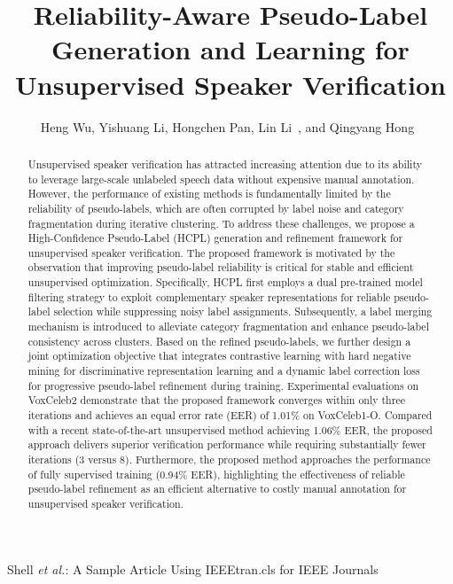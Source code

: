\documentclass[lettersize,journal]{IEEEtran}
\begin{document}
\title{Reliability-Aware Pseudo-Label Generation and Learning for Unsupervised Speaker Verification}

\author{Heng Wu, Yishuang Li, Hongchen Pan, Lin Li~, and Qingyang Hong~
}

%
{Shell \MakeLowercase{\textit{et al.}}: A Sample Article Using IEEEtran.cls for IEEE Journals}


\maketitle

\begin{abstract}
Unsupervised speaker verification has attracted increasing attention due to its ability to leverage large-scale unlabeled speech data without expensive manual annotation. However, the performance of existing methods is fundamentally limited by the reliability of pseudo-labels, which are often corrupted by label noise and category fragmentation during iterative clustering. To address these challenges, we propose a High-Confidence Pseudo-Label (HCPL) generation and refinement framework for unsupervised speaker verification. The proposed framework is motivated by the observation that improving pseudo-label reliability is critical for stable and efficient unsupervised optimization. Specifically, HCPL first employs a dual pre-trained model filtering strategy to exploit complementary speaker representations for reliable pseudo-label selection while suppressing noisy label assignments. Subsequently, a label merging mechanism is introduced to alleviate category fragmentation and enhance pseudo-label consistency across clusters. Based on the refined pseudo-labels, we further design a joint optimization objective that integrates contrastive learning with hard negative mining for discriminative representation learning and a dynamic label correction loss for progressive pseudo-label refinement during training. Experimental evaluations on VoxCeleb2 demonstrate that the proposed framework converges within only three iterations and achieves an equal error rate (EER) of 1.01\% on VoxCeleb1-O. Compared with a recent state-of-the-art unsupervised method achieving 1.06\% EER, the proposed approach delivers superior verification performance while requiring substantially fewer iterations (3 versus 8). Furthermore, the proposed method approaches the performance of fully supervised training (0.94\% EER), highlighting the effectiveness of reliable pseudo-label refinement as an efficient alternative to costly manual annotation for unsupervised speaker verification.
\end{abstract}
\end{document}
